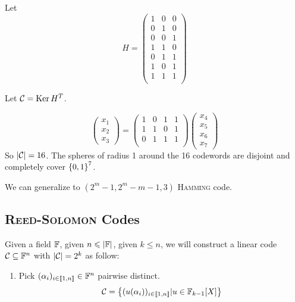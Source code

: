 \begin{example}
    Let
    \[
        H = \left(
            \begin{matrix}
                1 & 0 & 0\\
                0 & 1 & 0\\
                0 & 0 & 1\\
                1 & 1 & 0\\
                0 & 1 & 1\\
                1 & 0 & 1\\
                1 & 1 & 1\\
            \end{matrix}
        \right)
    \]
    
    Let $\mathcal{C} = \operatorname{Ker} H^T$.
    
    \[
        \left(
        \begin{matrix}
        x_1\\x_2\\x_3
        \end{matrix}
        \right) = \left( \begin{matrix}
        1&0&1&1\\
        1&1&0&1\\
        0&1&1&1\\
        \end{matrix} \right) \left( \begin{matrix}
        x_4\\x_5\\x_6\\x_7
        \end{matrix}\right)
    \]
    So $\left\lvert\mathcal{C}\right\rvert = 16$.
    The spheres of radius 1 around the 16 codewords are disjoint and completely cover $\left\{ 0,1 \right\}^7$.
\end{example}

We can generalize to $(2^m-1,2^m-m-1,3)$ \textsc{Hamming} code.

\subsection{\textsc{Reed-Solomon} Codes}

Given a field $\mathbb{F}$, given $n \leqslant \left\lvert\mathbb{F}\right\rvert$, given $k\leqslant n$, we will construct a linear code $\mathcal{C} \subseteq \mathbb{F}^n$ with $\left\lvert\mathcal{C}\right\rvert = 2^k$ as follow:
\begin{enumerate}[1)]
    \item Pick $(\alpha_i)_{i\in\left\llbracket 1,n \right\rrbracket} \in \mathbb{F}^n$ pairwise distinct.
        \[
            \mathcal{C} = \left\{ (u(\alpha_i))_{i\in\left\llbracket 1,n \right\rrbracket} \vert u \in \mathbb{F}_{k-1}[X] \right\}
        \]
\end{enumerate}

